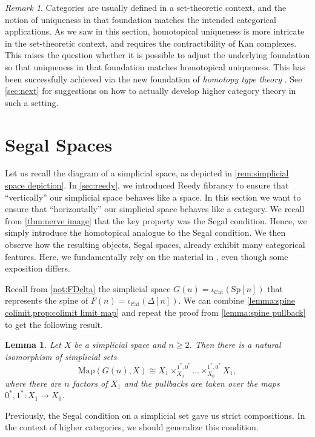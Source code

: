 \documentclass[11pt, a4paper]{amsart}
\newcommand{\Map}{\mathrm{Map}}
\newcommand{\Cat}{\mathscr{C}\mathrm{at}}
\newcommand{\Sp}{\mathrm{Sp}}
\newcommand{\inccat}{\iota_{\Cat}}
\newtheorem{lemma}[equation]{Lemma}
\theoremstyle{definition}
\theoremstyle{remark}
\newtheorem{remark}[equation]{Remark}
\numberwithin{equation}{section}
\begin{document}
\begin{remark} \label{rem:hott}
  Categories are usually defined in a set-theoretic context, and the notion of uniqueness in that foundation matches the intended categorical applications. As we saw in this section, homotopical uniqueness is more intricate in the set-theoretic context, and requires the contractibility of Kan complexes. This raises the question whether it is possible to adjust the underlying foundation so that uniqueness in that foundation matches homotopical uniqueness. This has been successfully achieved via the new foundation of \emph{homotopy type theory} \cite{hottbook2013}. See \cref{sec:next} for suggestions on how to actually develop higher category theory in such a setting. 
\end{remark}

\section{Segal Spaces} \label{sec:segal spaces} 
Let us recall the diagram of a simplicial space, as depicted in \cref{rem:simplicial space depiction}. In \cref{sec:reedy}, we introduced Reedy fibrancy to ensure that ``vertically'' our simplicial space behaves like a space. In this section we want to ensure that ``horizontally'' our simplicial space behaves like a category. We recall from \cref{thm:nerve image} that the key property was the Segal condition. Hence, we simply introduce the homotopical analogue to the Segal condition. We then observe how the resulting objects, Segal spaces, already exhibit many categorical features. Here, we fundamentally rely on the material in \cite[Section 5]{rezk2001css}, even though some exposition differs.

Recall from \cref{not:FDelta} the simplicial space $G(n) = \inccat(\Sp[n])$ that represents the spine of $F(n) = \inccat(\Delta[n])$. We can combine \cref{lemma:spine colimit,prop:colimit limit map} and repeat the proof from \cref{lemma:spine pullback} to get the following result.

\begin{lemma}
  Let $X$ be a simplicial space and $n \geq 2$. Then there is a natural isomorphism of simplicial sets
  \[\Map(G(n), X) \cong X_1 \times_{X_0}^{1^*,0^*} ... \times_{X_0}^{1^*,0^*} X_1,\]
  where there are $n$ factors of $X_1$ and the pullbacks are taken over the maps $0^*, 1^*\colon X_1 \to X_0$.
\end{lemma}

Previously, the Segal condition on a simplicial set gave us strict compositions. In the context of higher categories, we should generalize this condition.
\end{document}
